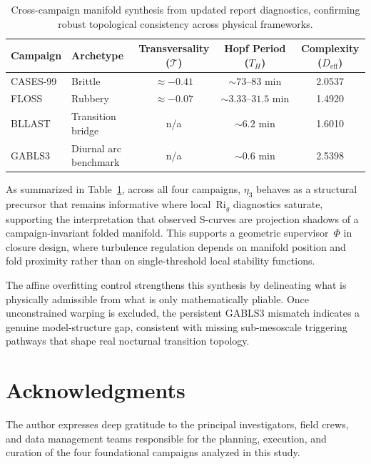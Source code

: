 \documentclass[12pt,a4paper]{article}
\newcommand{\Rig}{\mathrm{Ri}_g}
\begin{document}
\begin{table}[htbp]
\centering
\small
\setlength{\tabcolsep}{6pt}
\renewcommand{\arraystretch}{1.1}
\begin{tabularx}{\textwidth}{@{}l X c c c@{}}
\toprule
\textbf{Campaign} & \textbf{Archetype} & \textbf{Transversality ($\mathcal{T}$)} & \textbf{Hopf Period ($T_H$)} & \textbf{Complexity ($D_{\mathrm{eff}}$)} \\
\midrule
CASES-99 & Brittle               & $\approx -0.41$ & $\sim 73\text{--}83\text{~min}$   & 2.0537 \\
FLOSS    & Rubbery               & $\approx -0.07$ & $\sim 3.33\text{--}31.5\text{~min}$ & 1.4920 \\
BLLAST   & Transition bridge     & n/a             & $\sim 6.2\text{~min}$             & 1.6010 \\
GABLS3   & Diurnal arc benchmark & n/a             & $\sim 0.6\text{~min}$             & 2.5398 \\
\bottomrule
\end{tabularx}
\caption{Cross-campaign manifold synthesis from updated report diagnostics, confirming robust topological consistency across physical frameworks.}
\label{tab:campaign_synthesis}
\end{table}

As summarized in Table~\ref{tab:campaign_synthesis}, across all four campaigns, $\eta_3$ behaves as a structural precursor that remains informative where local~$\Rig$ diagnostics saturate, supporting the interpretation that observed S-curves are projection shadows of a campaign-invariant folded manifold. This supports a geometric supervisor~$\Phi$ in closure design, where turbulence regulation depends on manifold position and fold proximity rather than on single-threshold local stability functions.

The affine overfitting control strengthens this synthesis by delineating what is physically admissible from what is only mathematically pliable. Once unconstrained warping is excluded, the persistent GABLS3 mismatch indicates a genuine model-structure gap, consistent with missing sub-mesoscale triggering pathways that shape real nocturnal transition topology.
\section*{Acknowledgments}

The author expresses deep gratitude to the principal investigators, field crews, and data management teams responsible for the planning, execution, and curation of the four foundational campaigns analyzed in this study.
\end{document}
